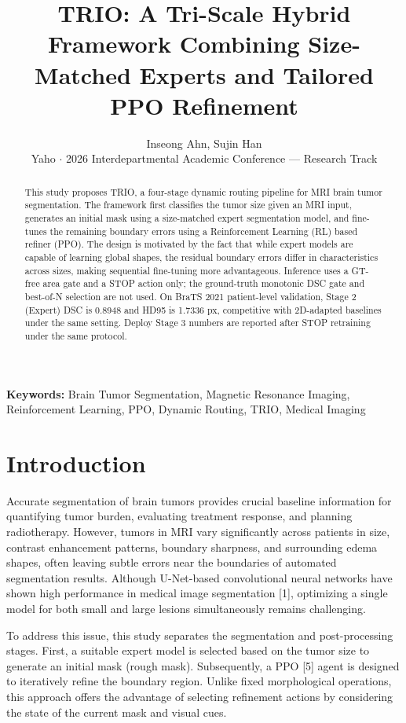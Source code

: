 \documentclass[11pt,a4paper]{article}
\title{TRIO: A Tri-Scale Hybrid Framework Combining Size-Matched Experts and Tailored PPO Refinement}
\author{Inseong Ahn, Sujin Han \\
\normalsize Yaho $\cdot$ 2026 Interdepartmental Academic Conference --- Research Track}
\date{}
\begin{document}
\maketitle

\begin{abstract}
This study proposes TRIO, a four-stage dynamic routing pipeline for MRI brain tumor segmentation. The framework first classifies the tumor size given an MRI input, generates an initial mask using a size-matched expert segmentation model, and fine-tunes the remaining boundary errors using a Reinforcement Learning (RL) based refiner (PPO). The design is motivated by the fact that while expert models are capable of learning global shapes, the residual boundary errors differ in characteristics across sizes, making sequential fine-tuning more advantageous. Inference uses a GT-free area gate and a STOP action only; the ground-truth monotonic DSC gate and best-of-N selection are not used. On BraTS 2021 patient-level validation, Stage 2 (Expert) DSC is 0.8948 and HD95 is 1.7336 px, competitive with 2D-adapted baselines under the same setting. Deploy Stage 3 numbers are reported after STOP retraining under the same protocol.
\end{abstract}

\noindent\textbf{Keywords:} Brain Tumor Segmentation, Magnetic Resonance Imaging, Reinforcement Learning, PPO, Dynamic Routing, TRIO, Medical Imaging

\section{Introduction}
Accurate segmentation of brain tumors provides crucial baseline information for quantifying tumor burden, evaluating treatment response, and planning radiotherapy. However, tumors in MRI vary significantly across patients in size, contrast enhancement patterns, boundary sharpness, and surrounding edema shapes, often leaving subtle errors near the boundaries of automated segmentation results. Although U-Net-based convolutional neural networks have shown high performance in medical image segmentation [1], optimizing a single model for both small and large lesions simultaneously remains challenging.

To address this issue, this study separates the segmentation and post-processing stages. First, a suitable expert model is selected based on the tumor size to generate an initial mask (rough mask). Subsequently, a PPO [5] agent is designed to iteratively refine the boundary region. Unlike fixed morphological operations, this approach offers the advantage of selecting refinement actions by considering the state of the current mask and visual cues.
\end{document}
